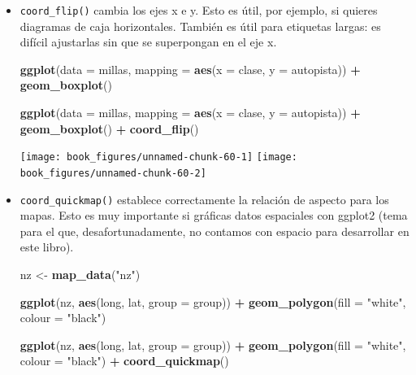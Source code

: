 \documentclass[11pt,oneside]{report}
\newenvironment{Shaded}{\begin{snugshade}}{\end{snugshade}}
\newcommand{\DataTypeTok}[1]{\textcolor[rgb]{0.13,0.29,0.53}{#1}}
\newcommand{\KeywordTok}[1]{\textcolor[rgb]{0.13,0.29,0.53}{\textbf{#1}}}
\newcommand{\NormalTok}[1]{#1}
\newcommand{\OperatorTok}[1]{\textcolor[rgb]{0.81,0.36,0.00}{\textbf{#1}}}
\newcommand{\StringTok}[1]{\textcolor[rgb]{0.31,0.60,0.02}{#1}}
\begin{document}
\begin{itemize}
\item
  \texttt{coord\_flip()} cambia los ejes x e y. Esto es útil, por
  ejemplo, si quieres diagramas de caja horizontales. También es útil
  para etiquetas largas: es difícil ajustarlas sin que se superpongan en
  el eje x.

\begin{Shaded}
\begin{Highlighting}[]
\KeywordTok{ggplot}\NormalTok{(}\DataTypeTok{data =}\NormalTok{ millas, }\DataTypeTok{mapping =} \KeywordTok{aes}\NormalTok{(}\DataTypeTok{x =}\NormalTok{ clase, }\DataTypeTok{y =}\NormalTok{ autopista)) }\OperatorTok{+}
\StringTok{  }\KeywordTok{geom_boxplot}\NormalTok{()}

\KeywordTok{ggplot}\NormalTok{(}\DataTypeTok{data =}\NormalTok{ millas, }\DataTypeTok{mapping =} \KeywordTok{aes}\NormalTok{(}\DataTypeTok{x =}\NormalTok{ clase, }\DataTypeTok{y =}\NormalTok{ autopista)) }\OperatorTok{+}
\StringTok{  }\KeywordTok{geom_boxplot}\NormalTok{() }\OperatorTok{+}
\StringTok{  }\KeywordTok{coord_flip}\NormalTok{()}
\end{Highlighting}
\end{Shaded}

  \texttt{[image: book\_figures/unnamed-chunk-60-1]}
  \texttt{[image: book\_figures/unnamed-chunk-60-2]}
\item
  \texttt{coord\_quickmap()} establece correctamente la relación de
  aspecto para los mapas. Esto es muy importante si gráficas datos
  espaciales con ggplot2 (tema para el que, desafortunadamente, no
  contamos con espacio para desarrollar en este libro).

\begin{Shaded}
\begin{Highlighting}[]
\NormalTok{nz <-}\StringTok{ }\KeywordTok{map_data}\NormalTok{(}\StringTok{"nz"}\NormalTok{)}

\KeywordTok{ggplot}\NormalTok{(nz, }\KeywordTok{aes}\NormalTok{(long, lat, }\DataTypeTok{group =}\NormalTok{ group)) }\OperatorTok{+}
\StringTok{  }\KeywordTok{geom_polygon}\NormalTok{(}\DataTypeTok{fill =} \StringTok{"white"}\NormalTok{, }\DataTypeTok{colour =} \StringTok{"black"}\NormalTok{)}

\KeywordTok{ggplot}\NormalTok{(nz, }\KeywordTok{aes}\NormalTok{(long, lat, }\DataTypeTok{group =}\NormalTok{ group)) }\OperatorTok{+}
\StringTok{  }\KeywordTok{geom_polygon}\NormalTok{(}\DataTypeTok{fill =} \StringTok{"white"}\NormalTok{, }\DataTypeTok{colour =} \StringTok{"black"}\NormalTok{) }\OperatorTok{+}
\StringTok{  }\KeywordTok{coord_quickmap}\NormalTok{()}
\end{Highlighting}
\end{Shaded}


\end{itemize}
\end{document}
